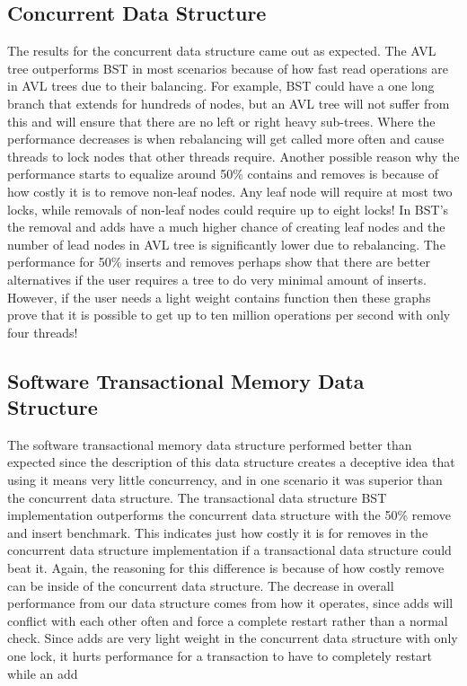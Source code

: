 \documentclass[conference]{IEEEtran}
\begin{document}
\subsection{Concurrent Data Structure}
The results for the concurrent data structure came out as expected. The AVL tree outperforms BST in most scenarios because of how fast read operations are in AVL trees due to their balancing. For example, BST could have a one long branch that extends for hundreds of nodes, but an AVL tree will not suffer from this and will ensure that there are no left or right heavy sub-trees. Where the performance decreases is when rebalancing will get called more often and cause threads to lock nodes that other threads require. Another possible reason why the performance starts to equalize around 50\% contains and removes is because of how costly it is to remove non-leaf nodes. Any leaf node will require at most two locks, while removals of non-leaf nodes could require up to eight locks! In BST's the removal and adds have a much higher chance of creating leaf nodes and the number of lead nodes in AVL tree is significantly lower due to rebalancing. The performance for 50\% inserts and removes perhaps show that there are better alternatives if the user requires a tree to do very minimal amount of inserts. However, if the user needs a light weight contains function then these graphs prove that it is possible to get up to ten million operations per second with only four threads!
\subsection{Software Transactional Memory Data Structure}
The software transactional memory data structure performed better than expected since the description of this data structure creates a deceptive idea that using it means very little concurrency, and in one scenario it was superior than the concurrent data structure. The transactional data structure BST implementation outperforms the concurrent data structure with the 50\% remove and insert benchmark. This indicates just how costly it is for removes in the concurrent data structure implementation if a transactional data structure could beat it. Again, the reasoning for this difference is because of how costly remove can be inside of the concurrent data structure. The decrease in overall performance from our data structure comes from how it operates, since adds will conflict with each other often and force a complete restart rather than a normal check. Since adds are very light weight in the concurrent data structure with only one lock, it hurts performance for a transaction to have to completely restart while an add
\end{document}
